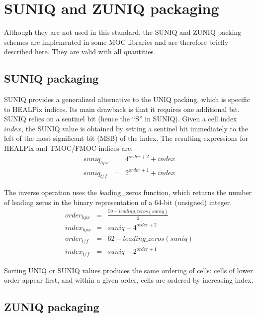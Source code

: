 \section{SUNIQ and ZUNIQ packaging}

Although they are not used in this standard, the SUNIQ and ZUNIQ packing schemes
are implemented in some MOC libraries and are therefore briefly described here.
They are valid with all quantities.

\subsection{SUNIQ packaging}

SUNIQ provides a generalized alternative to the UNIQ packing, which is specific to HEALPix indices.
Its main drawback is that it requires one additional bit.
SUNIQ relies on a sentinel bit (hence the “S” in SUNIQ).
Given a cell index $index$, the SUNIQ value is obtained by setting a sentinel bit immediately to the
left of the most significant bit (MSB) of the index.
 The resulting expressions for HEALPix and TMOC/FMOC indices are:
\begin{eqnarray*}
  suniq_{hpx} & = & 4^{order + 2} + index \\
  suniq_{t/f} & = & 2^{order + 1} + index
\end{eqnarray*}

The inverse operation uses the {\textit leading\_zeros} function,
which returns the number of leading zeros in the binary representation of a 64-bit (unsigned) integer.
\begin{eqnarray*}
  order_{hpx} & = & \frac{59 - leading\_zeros(suniq)}{2} \\
  index_{hpx} & = & suniq - 4^{order + 2} \\
  order_{t/f} & = & 62 - leading\_zeros(suniq) \\
  index_{t/f} & = & suniq - 2^{order + 1}
\end{eqnarray*}

Sorting UNIQ or SUNIQ values produces the same ordering of cells: cells of lower order appear first,
and within a given order, cells are ordered by increasing index.


\subsection{ZUNIQ packaging}

